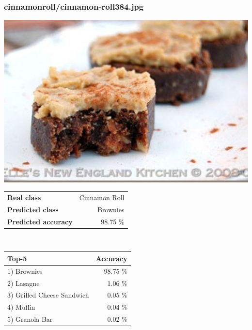\subsubsection{cinnamon\textunderscore roll/cinnamon-roll384.jpg}

\begin{minipage}[t]{0.4\textwidth}
	\vspace{0pt}
	\includegraphics[width=\linewidth]{images/evaluation-images/cinnamon_roll/cinnamon-roll384.jpg}
\end{minipage}
\hfill
\begin{minipage}[t]{0.5\textwidth}
	\vspace{0pt}\raggedright
	\begin{tabularx}{\textwidth}{X r}
		\small \textbf{Real class} & \small Cinnamon Roll\\
		\small \textbf{Predicted class} & \small Brownies\\
		\small \textbf{Predicted accuracy} & \small 98.75 \%
    \end{tabularx}\\
    
    \vspace{6pt}
	\begin{tabularx}{\textwidth}{X r}
        \small \textbf{Top-5} & \small \textbf{Accuracy} \\
        \hline
		\small 1) Brownies & \small 98.75 \%\\\small 2) Lasagne & \small 1.06 \%\\\small 3) Grilled Cheese Sandwich & \small 0.05 \%\\\small 4) Muffin & \small 0.04 \%\\\small 5) Granola Bar & \small 0.02 \%
    \end{tabularx}
\end{minipage}
    
